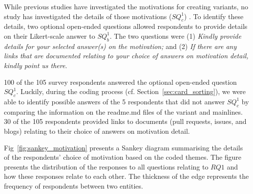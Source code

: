 While previous studies have investigated the motivations for creating variants, no study has investigated the details of those motivations ($SQ^1_{c}$) .
To identify these details, two optional open-ended questions allowed respondents to provide details on their Likert-scale answer to $SQ^1_{b}$. The two questions were
(1) \emph{Kindly provide details for your selected answer(s) on the motivation;}
and (2) \emph{If there are any links that are documented relating to your choice of answers on motivation detail, kindly point us there}.

100 of the 105 survey respondents answered the optional open-ended question $SQ^1_{c}$. Luckily, during the coding process (cf. Section~\ref{sec:card_sorting}), we were able to identify possible answers of the 5 respondents that did not answer $SQ^1_{c}$ by comparing the information on the \textsf{readme.md} files of the variant and mainlines. 30 of the 105 respondents provided links to documents (pull requests, issues, and blogs) relating to their choice of answers on motivation detail.



Fig~\ref{fig:sankey_motivation} presents a Sankey diagram summarising the details of the respondents' choice of motivation based on the coded themes. 
The figure  presents the distribution of the responses to all questions relating to $RQ1$ and how these responses relate to each other. The thickness of the edge represents the frequency of respondents between two entities.

